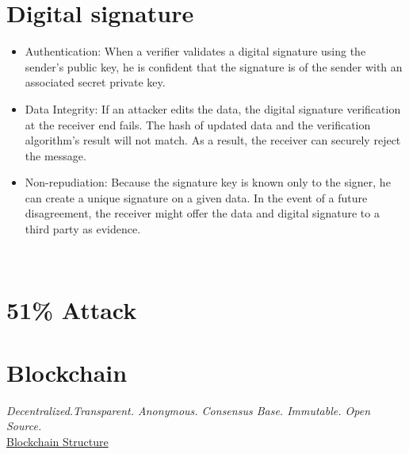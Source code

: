 \section{Digital signature }
\begin{itemize}
\item Authentication: When a verifier validates a digital signature using the sender's public key, he is confident that the signature is of the sender with an associated secret private key.
\item Data Integrity: If an attacker edits the data, the digital signature verification at the receiver end fails. The hash of updated data and the verification algorithm’s result will not match. As a result, the receiver can securely reject the message.
\item Non-repudiation: Because the signature key is known only to the signer, he can create a unique signature on a given data. In the event of a future disagreement, the receiver might offer the data and digital signature to a third party as evidence.
\end{itemize}\


\section{51\% Attack}

\section{Blockchain}
\textit{Decentralized.Transparent. Anonymous. Consensus Base. Immutable. Open Source.\\}
\underline{Blockchain Structure}\\


